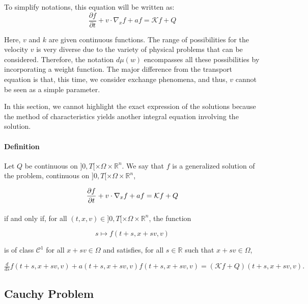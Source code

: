 \documentclass[onecolumn, 12pt, a4paper]{article}
\begin{document}
To simplify notations, this equation will be written as: 
\[ \frac{\partial f}{\partial t}+v \cdot \nabla_x f +af =   \mathcal{K} f +Q \]

Here, $v$ and $k$ are given continuous functions. The range of possibilities for the velocity $v$ is very diverse due to the variety of physical problems that can be considered. Therefore, the notation $d\mu(w)$ encompasses all these possibilities by incorporating a weight function. The major difference from the transport equation is that, this time, we consider exchange phenomena, and thus, $v$ cannot be seen as a simple parameter.

In this section, we cannot highlight the exact expression of the solutions because the method of characteristics yields another integral equation involving the solution.




\paragraph{Definition}

Let $Q$ be continuous on $]0,T[\times \Omega \times \mathbb{R}^n$. We say that $f$ is a generalized solution of the problem, continuous on $]0,T[\times \Omega \times \mathbb{R}^n$,


$$\frac{\partial f}{\partial t}+v \cdot \nabla_x f +af = \mathcal{K} f +Q\\$$

\paragraph{}
if and only if, for all $(t,x,v) \in ]0,T[\times \Omega \times \mathbb{R}^n$, the function 

\[ s \mapsto f(t+s,x+sv,v) \]

is of class $\mathcal{C}^1$ for all $x+sv \in \Omega$ and satisfies, for all $s \in \mathbb{R}$ such that $x +sv \in \Omega$,

$\frac{d}{ds}f(t+s,x+sv,v) +a(t+s,x+sv,v)f(t+s,x+sv,v) = (\mathcal{K}f+ Q)(t+s,x+sv,v).$

\subsection{Cauchy Problem}
\paragraph{}
\end{document}
